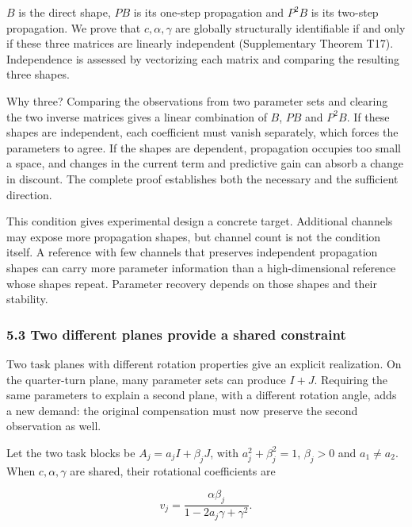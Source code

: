 \documentclass[11pt,a4paper]{article}
\begin{document}
\(B\) is the direct shape, \(PB\) is its one-step propagation and
\(P^2B\) is its two-step propagation. We prove that \(c,\alpha,\gamma\)
are globally structurally identifiable if and only if these three
matrices are linearly independent (Supplementary Theorem T17).
Independence is assessed by vectorizing each matrix and comparing the
resulting three shapes.

Why three? Comparing the observations from two parameter sets and
clearing the two inverse matrices gives a linear combination of \(B\),
\(PB\) and \(P^2B\). If these shapes are independent, each coefficient
must vanish separately, which forces the parameters to agree. If the
shapes are dependent, propagation occupies too small a space, and
changes in the current term and predictive gain can absorb a change in
discount. The complete proof establishes both the necessary and the
sufficient direction.

This condition gives experimental design a concrete target. Additional
channels may expose more propagation shapes, but channel count is not
the condition itself. A reference with few channels that preserves
independent propagation shapes can carry more parameter information than
a high-dimensional reference whose shapes repeat. Parameter recovery
depends on those shapes and their stability.

\subsubsection{5.3 Two different planes provide a shared
constraint}\label{two-different-planes-provide-a-shared-constraint}

Two task planes with different rotation properties give an explicit
realization. On the quarter-turn plane, many parameter sets can produce
\(I+J\). Requiring the same parameters to explain a second plane, with a
different rotation angle, adds a new demand: the original compensation
must now preserve the second observation as well.

\par
\noindent\begin{minipage}{\linewidth}

Let the two task blocks be \(A_j=a_jI+\beta_jJ\), with
\(a_j^2+\beta_j^2=1\), \(\beta_j>0\) and \(a_1\neq a_2\). When
\(c,\alpha,\gamma\) are shared, their rotational coefficients are

\[
v_j=\frac{\alpha\beta_j}{1-2a_j\gamma+\gamma^2}.
\]

\end{minipage}\par
\end{document}
